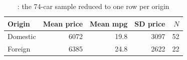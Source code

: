 \begin{table}[htbp]\centering
\caption{: the 74-car sample reduced to one row per origin}
\begin{tabular}{lrrrr}
\toprule
Origin & Mean price & Mean mpg & SD price & \(N\) \\
\midrule
Domestic &   6072 &  19.8 &   3097 &  52 \\
Foreign &   6385 &  24.8 &   2622 &  22 \\
\bottomrule
\end{tabular}
\end{table}
